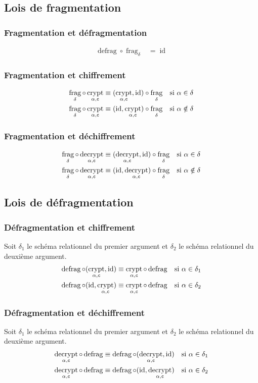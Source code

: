 \documentclass[french]{article}
\DeclareMathOperator{\frag}{frag}
\DeclareMathOperator{\defrag}{defrag}
\DeclareMathOperator{\crypt}{crypt}
\DeclareMathOperator{\decrypt}{decrypt}
\DeclareMathOperator{\id}{id}
\newcommand\typeT[1]{\text{\ttfamily #1}}
\newcommand{\decryptArgs}[2]{\decrypt_{#1 , \typeT{#2}}}
\newcommand{\cryptArgs}[2]{\crypt_{#1 , \typeT{#2}}}
\newcommand{\decryptCAlpha}{\decryptArgs{\alpha}{c}}
\newcommand{\cryptCAlpha}{\cryptArgs{\alpha}{c}}
\newcommand{\fragDelta}{\frag_{\delta}}
\newcommand{\args}{Soit $\delta_1$ le schéma relationnel du premier
	argument et $\delta_2$ le schéma relationnel du deuxième
	argument.}
\begin{document}
\subsection*{Lois de fragmentation}
\subsubsection*{Fragmentation et défragmentation}
\begin{align}
\defrag \circ \fragDelta
& = \id
\end{align}
\subsubsection*{Fragmentation et chiffrement}
\begin{align}
\fragDelta \circ \cryptCAlpha
& \equiv (\cryptCAlpha, \id) \circ\fragDelta 
& \text{si $\alpha \in \delta$}
\label{fragCrypt1} \\
\fragDelta \circ \cryptCAlpha
& \equiv (\id, \cryptCAlpha) \circ\fragDelta 
& \text{si $\alpha \notin \delta$}
\end{align}
\subsubsection*{Fragmentation et déchiffrement}
\begin{align}
\fragDelta \circ \decryptCAlpha
& \equiv (\decryptCAlpha, \id) \circ \fragDelta
& \text{si $\alpha \in \delta$} \\
\fragDelta \circ \decryptCAlpha
& \equiv (\id, \decryptCAlpha) \circ \fragDelta
& \text{si $\alpha \notin \delta$}
\end{align}

\subsection*{Lois de défragmentation}
\subsubsection*{Défragmentation et chiffrement}
\args
\begin{align}
\defrag \circ (\cryptCAlpha, \id)
& \equiv \cryptCAlpha \circ \defrag 
& \text{si $\alpha \in \delta_1$} \\
\defrag \circ (\id, \cryptCAlpha)
& \equiv \cryptCAlpha \circ \defrag 
& \text{si $\alpha \in \delta_2$} 
\end{align}

\subsubsection*{Défragmentation et déchiffrement}
\args
\begin{align}
\decryptCAlpha \circ \defrag 
& \equiv \defrag \circ (\decryptCAlpha, \id)
& \text{si $\alpha \in \delta_1$} \\
\decryptCAlpha \circ \defrag 
& \equiv \defrag \circ (\id, \decryptCAlpha)
& \text{si $\alpha \in \delta_2$}
\end{align}
\end{document}
